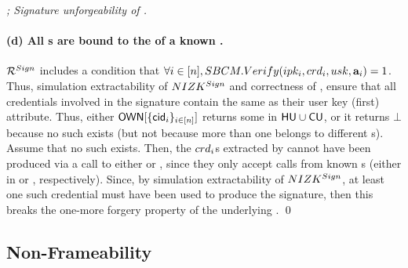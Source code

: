 \begin{proof}[; Signature unforgeability of \CUASGen]
  \paragraph{(d) All {\cred}s are bound to the \usk of a known \uid.} %
  $\mathcal{R}^{Sign}$ includes a condition that $\forall i\in[n],
  SBCM.Verify(ipk_i,crd_i,usk,\mathbf{a}_i) = 1$. Thus, simulation
  extractability of $NIZK^{Sign}$ and correctness of \SBCM, ensure that all
  credentials involved in the signature contain the same \usk as their user key
  (first) attribute. Thus, either $\mathsf{OWN}[\lbrace \mathsf{cid}_i \rbrace_{i\in[n]}]$
  returns some \uid in $\mathsf{HU} \cup \mathsf{CU}$, or it returns $\bot$ because no such
  \uid exists (but not because more than one \cid belongs to different {\uid}s).
  Assume that no such \uid exists. Then, the {$crd_i$}s extracted by
  \ExtractSign cannot have been produced via a call to either \OBTISS or \ISSUE,
  since they only accept calls from known {\uid}s (either in \HU or \CU,
  respectively). Since, by simulation extractability of $NIZK^{Sign}$, at
  least one such credential must have been used to produce the signature, then
  this breaks the one-more forgery property of the underlying \SBCM.
  \qed
\end{proof}

\subsection{Non-Frameability}

